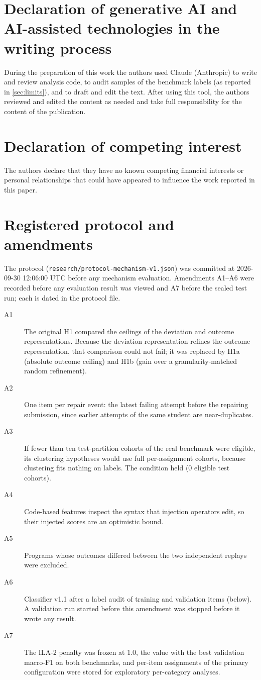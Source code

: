 \documentclass[a4paper,preprint,12pt,authoryear]{elsarticle}
\begin{document}
\section*{Declaration of generative AI and AI-assisted technologies in the writing process}
During the preparation of this work the authors used Claude (Anthropic) to write and review analysis code, to audit samples of the benchmark labels (as reported in \cref{sec:limits}), and to draft and edit the text. After using this tool, the authors reviewed and edited the content as needed and take full responsibility for the content of the publication.

\section*{Declaration of competing interest}
The authors declare that they have no known competing financial interests or personal relationships that could have appeared to influence the work reported in this paper.


\appendix
\section{Registered protocol and amendments}\label{app:protocol}

The protocol (\texttt{research/protocol-mechanism-v1.json}) was committed at 2026-09-30 12:06:00 UTC before any mechanism evaluation. Amendments A1--A6 were recorded before any evaluation result was viewed and A7 before the sealed test run; each is dated in the protocol file.
\begin{description}
\item[A1] The original H1 compared the ceilings of the deviation and outcome representations. Because the deviation representation refines the outcome representation, that comparison could not fail; it was replaced by H1a (absolute outcome ceiling) and H1b (gain over a granularity-matched random refinement).
\item[A2] One item per repair event: the latest failing attempt before the repairing submission, since earlier attempts of the same student are near-duplicates.
\item[A3] If fewer than ten test-partition cohorts of the real benchmark were eligible, its clustering hypotheses would use full per-assignment cohorts, because clustering fits nothing on labels. The condition held (0 eligible test cohorts).
\item[A4] Code-based features inspect the syntax that injection operators edit, so their injected scores are an optimistic bound.
\item[A5] Programs whose outcomes differed between the two independent replays were excluded.
\item[A6] Classifier v1.1 after a label audit of training and validation items (below). A validation run started before this amendment was stopped before it wrote any result.
\item[A7] The ILA-2 penalty was frozen at 1.0, the value with the best validation macro-F1 on both benchmarks, and per-item assignments of the primary configuration were stored for exploratory per-category analyses.
\end{description}
\end{document}
